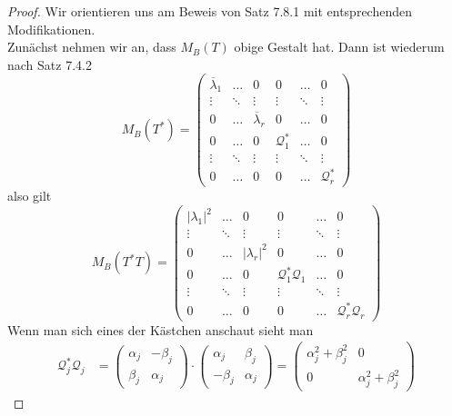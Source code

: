 \documentclass[12pt,a4paper]{article}
\theoremstyle{definition}
\theoremstyle{remark}
\renewcommand{\bar}[1]{\overline{#1}}
\begin{document}
	\begin{proof}
		Wir orientieren uns am Beweis von Satz 7.8.1 mit entsprechenden Modifikationen. \\
		Zunächst nehmen wir an, dass $M_B(T)$ obige Gestalt hat. Dann ist wiederum nach Satz 7.4.2
		\begin{equation}
			M_B(T^*) =
			\begin{pmatrix}
				\bar{\lambda}_1 & \dots & 0 &0 & \dots & 0 \\
				\vdots &\ddots & \vdots & \vdots & \ddots& \vdots\\
				0 & \dots & \bar{\lambda}_r & 0 &\dots & 0 \\
				0 & \dots & 0 & \mathcal{Q}_1^* & \dots & 0 \\
				\vdots & \ddots & \vdots & \vdots & \ddots & \vdots \\
				0 & \dots & 0 & 0 & \dots & \mathcal{Q}_r^*
			\end{pmatrix}
		\end{equation}
		also gilt 
		\begin{equation}
			M_B(T^*T) =
			\begin{pmatrix}
				|\lambda_1|^2 & \dots & 0 &0 & \dots & 0 \\
				\vdots &\ddots & \vdots & \vdots & \ddots& \vdots\\
				0 & \dots & |\lambda_r|^2 & 0 &\dots & 0 \\
				0 & \dots & 0 & \mathcal{Q}_1^* \mathcal{Q}_1 & \dots & 0 \\
				\vdots & \ddots & \vdots & \vdots & \ddots & \vdots \\
				0 & \dots & 0 & 0 & \dots & \mathcal{Q}_r^* \mathcal{Q}_r
			\end{pmatrix}
		\end{equation}
		Wenn man sich eines der Kästchen anschaut sieht man
		\begin{equation}
			\begin{split}
				\mathcal{Q}_j^* \mathcal{Q}_j &= \begin{pmatrix}
					\alpha_j & -\beta_j \\
					\beta_j & \alpha_j
				\end{pmatrix} \cdot \begin{pmatrix}
					\alpha_j & \beta_j \\
					-\beta_j & \alpha_j
				\end{pmatrix} = \begin{pmatrix}
					\alpha_j^2 + \beta_j^2 & 0 \\
					0 & \alpha_j^2 + \beta_j^2

\end{pmatrix}
\end{split}
\end{equation}
\end{proof}
\end{document}
